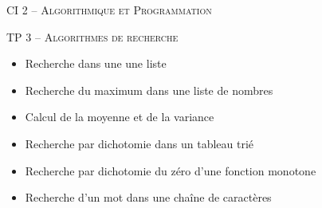 \documentclass[11pt,oneside]{article}
\begin{document}
\pagestyle{fancy}
\renewcommand{\headrulewidth}{0pt}

\fancyhead{}

\fancyhead[C]{\rule{12cm}{.5pt}}


\renewcommand{\footrulewidth}{0.2pt}

\fancyfoot[C]{\footnotesize{\bfseries \thepage}}



\begin{center}
 \huge\textsc{CI 2 -- Algorithmique et Programmation}

\end{center}

\begin{center}
 \LARGE\textsc{TP 3 -- Algorithmes de recherche}
\end{center}

\begin{savoir}
\begin{itemize}
\item Recherche dans une une liste
\item Recherche du maximum dans une liste de nombres
\item Calcul de la moyenne et de la variance
\item Recherche par dichotomie dans un tableau trié
\item Recherche par dichotomie du zéro d'une fonction monotone
\item Recherche d'un mot dans une chaîne de caractères
\end{itemize}
\end{savoir}
 
\end{document}
